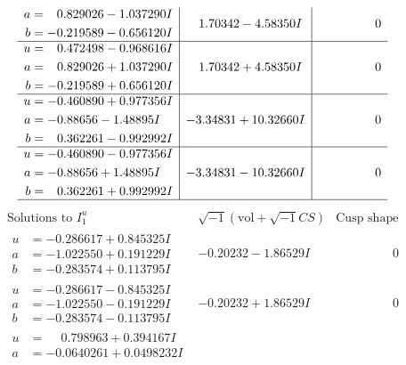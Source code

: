 \documentclass[1p]{elsarticle_modified}
\theoremstyle{definition}
\newcommand{\I}{\sqrt{-1}}
\begin{document}
$$\begin{array}{c|c|c}
\begin{aligned}
a &= \phantom{-}0.829026 - 1.037290 I \\
b &= -0.219589 - 0.656120 I\end{aligned}
 & \phantom{-}1.70342 - 4.58350 I & \phantom{-0.000000 } 0 \\ \hline\begin{aligned}
u &= \phantom{-}0.472498 - 0.968616 I \\
a &= \phantom{-}0.829026 + 1.037290 I \\
b &= -0.219589 + 0.656120 I\end{aligned}
 & \phantom{-}1.70342 + 4.58350 I & \phantom{-0.000000 } 0 \\ \hline\begin{aligned}
u &= -0.460890 + 0.977356 I \\
a &= -0.88656 - 1.48895 I \\
b &= \phantom{-}0.362261 - 0.992992 I\end{aligned}
 & -3.34831 + 10.32660 I & \phantom{-0.000000 } 0 \\ \hline\begin{aligned}
u &= -0.460890 - 0.977356 I \\
a &= -0.88656 + 1.48895 I \\
b &= \phantom{-}0.362261 + 0.992992 I\end{aligned}
 & -3.34831 - 10.32660 I & \phantom{-0.000000 } 0\\
 \hline 
 \end{array}$$\newpage$$\begin{array}{c|c|c}  
\text{Solutions to }I^u_{1}& \I (\text{vol} + \sqrt{-1}CS) & \text{Cusp shape}\\
 \hline 
\begin{aligned}
u &= -0.286617 + 0.845325 I \\
a &= -1.022550 + 0.191229 I \\
b &= -0.283574 + 0.113795 I\end{aligned}
 & -0.20232 - 1.86529 I & \phantom{-0.000000 } 0 \\ \hline\begin{aligned}
u &= -0.286617 - 0.845325 I \\
a &= -1.022550 - 0.191229 I \\
b &= -0.283574 - 0.113795 I\end{aligned}
 & -0.20232 + 1.86529 I & \phantom{-0.000000 } 0 \\ \hline\begin{aligned}
u &= \phantom{-}0.798963 + 0.394167 I \\
a &= -0.0640261 + 0.0498232 I \\

\end{aligned}
\end{array}$$
\end{document}
